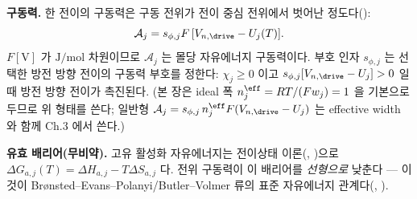 \textbf{구동력.} 한 전이의 구동력은 구동 전위가 전이 중심 전위에서 벗어난 정도다():
\begin{equation}
\mathcal A_j=s_{\phi,j}F\,[V_{n,\drive}-U_j(T)].
\label{eq:Aj}
\end{equation}
$F[\mathrm V]$ 가 $\mathrm{J/mol}$ 차원이므로 $\mathcal A_j$ 는 몰당 자유에너지 구동력이다. 부호 인자
$s_{\phi,j}$ 는 선택한 방전 방향 전이의 구동력 부호를 정한다: $\chi_j\ge0$ 이고 $s_{\phi,j}[V_{n,\drive}-U_j]>0$
일 때 방전 방향 전이가 촉진된다. (본 장은 ideal 폭 $n_j^{\eff}=RT/(Fw_j)=1$ 을 기본으로 두므로 위 형태를 쓴다;
일반형 $\mathcal A_j=s_{\phi,j}\,n_j^{\eff}F(V_{n,\drive}-U_j)$ 는 effective width 와 함께 Ch.3 에서 쓴다.)

\textbf{유효 배리어(무비약).} 고유 활성화 자유에너지는 전이상태 이론(, \cite{eyring1935})으로
$\Delta G_{a,j}(T)=\Delta H_{a,j}-T\Delta S_{a,j}$ 다. 전위 구동력이 이 배리어를 \emph{선형으로} 낮춘다 —
이것이 Brønsted--Evans--Polanyi/Butler--Volmer 류의 표준 자유에너지 관계다(,
\cite{evanspolanyi1938,bardfaulkner,bazant2013}).

